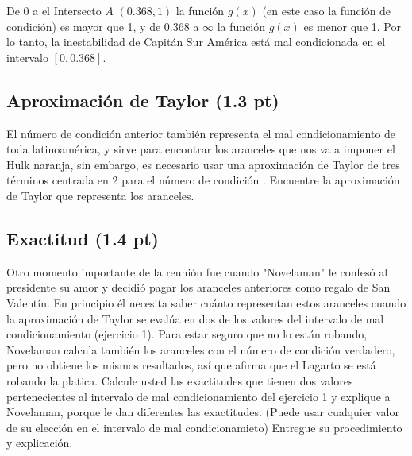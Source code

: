 De $0$ a el Intersecto $A$ $(0.368, 1)$ la función $g(x)$ (en este caso la función de condición)
es mayor que 1, y de $0.368$ a $\infty$ la función $g(x)$ es menor que 1. Por lo tanto,
la inestabilidad de Capitán Sur América está mal condicionada en el intervalo $[0, 0.368]$.

\subsection{Aproximación de Taylor (1.3 pt)}
El número de condición anterior también representa el mal condicionamiento de toda latinoamérica, y sirve para encontrar los aranceles que nos va a imponer el Hulk naranja, sin embargo, es necesario usar una aproximación de Taylor  de tres términos centrada en 2 para el número de condición . Encuentre la aproximación de Taylor que representa los aranceles.


\subsection{Exactitud (1.4 pt)}

Otro momento importante  de la reunión  fue cuando "Novelaman" le confesó al presidente  su amor y decidió  pagar los aranceles anteriores como regalo de San Valentín. En principio él necesita saber cuánto representan estos aranceles cuando la aproximación de Taylor se evalúa en dos de los valores del intervalo de mal condicionamiento (ejercicio 1). Para estar seguro que no lo están robando, Novelaman calcula también los aranceles con el número de condición verdadero, pero no obtiene los mismos resultados, así que afirma que el Lagarto se está robando la platica.  Calcule usted las exactitudes que tienen dos valores pertenecientes al intervalo de mal condicionamiento del ejercicio 1 y explique a Novelaman, porque le dan diferentes las exactitudes.  (Puede usar cualquier valor de su elección en el intervalo de mal condicionamieto) Entregue su procedimiento y explicación.